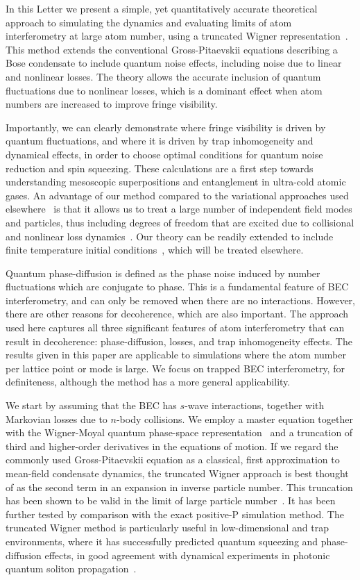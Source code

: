 \documentclass[aps,prl,twocolumn,showpacs,amsmath,amssymb,superscriptaddress,flushbottom,noraggedfooter]{revtex4-1}
\begin{document}
In this Letter we present a simple, yet quantitatively accurate theoretical approach
to simulating the dynamics and evaluating limits of atom interferometry at large atom number,
using a truncated Wigner representation~\cite{Drummond1993,Steel1998,Sinatra2002}.
This method extends the conventional Gross-Pitaevskii equations
describing a Bose condensate to include quantum noise effects,
including noise due to linear and nonlinear losses.
The theory allows the accurate inclusion of quantum fluctuations due to nonlinear losses,
which is a dominant effect when atom numbers are increased to improve fringe visibility.

Importantly, we can clearly demonstrate where fringe visibility is driven by quantum fluctuations,
and where it is driven by trap inhomogeneity and dynamical effects,
in order to choose optimal conditions for quantum noise reduction and spin squeezing.
These calculations are a first step towards understanding mesoscopic superpositions and entanglement in ultra-cold atomic gases.
An advantage of our method compared to the variational approaches used elsewhere~\cite{Li2009,Sakmann2009}
is that it allows us to treat a large number of independent field modes and particles,
thus including degrees of freedom that are excited due to
collisional and nonlinear loss dynamics~\cite{Norrie2005,Deuar2007}.
Our theory can be readily extended to include finite temperature initial conditions~\cite{Steel1998,Isella2006},
which will be treated elsewhere.

Quantum phase-diffusion is defined as the phase noise induced by number fluctuations
which are conjugate to phase.
This is a fundamental feature of BEC interferometry, and can only be removed when there are no interactions.
However, there are other reasons for decoherence, which are also important.
The approach used here captures all three significant features of atom
interferometry that can result in decoherence: phase-diffusion, losses,
and trap inhomogeneity effects.
The results given in this paper are applicable to simulations where the
atom number per lattice point or mode is large.
We focus on trapped BEC interferometry, for definiteness, although the method has a more general applicability.

We start by assuming that the BEC has $s$-wave interactions,
together with Markovian losses due to $n$-body collisions.
We employ a master equation together with the Wigner-Moyal quantum phase-space representation~\cite{Gardiner2004}
and a truncation of third and higher-order derivatives in the equations of motion.
If we regard the commonly used Gross-Pitaevskii equation as a classical,
first approximation to mean-field condensate dynamics,
the truncated Wigner approach is best thought of as the second term in an expansion in inverse particle number.
This truncation has been shown to be valid in the limit of large particle
number~\cite{Drummond1993,Steel1998,Sinatra2002}.
It has been further tested by comparison with the exact positive-P simulation method.
The truncated Wigner method is particularly useful in low-dimensional and
trap environments, where it has successfully predicted quantum squeezing
and phase-diffusion effects, in good agreement with dynamical experiments
in photonic quantum soliton propagation~\cite{Carter1987,Corney2008}.
\end{document}
